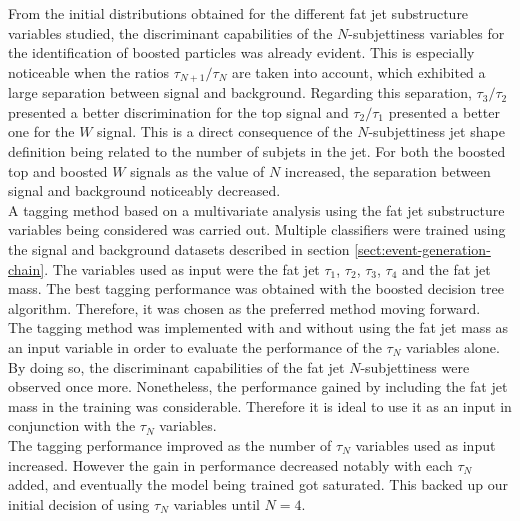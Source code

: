 \documentclass[main]{subfiles} %
\begin{document}


\doublespacing

\vspace{20pt}

From the initial distributions obtained for the different fat jet substructure variables studied, the discriminant capabilities of the $N$-subjettiness variables for the identification of boosted particles was already evident. This is especially noticeable when the ratios $\tau_{N+1}/\tau_N$ are taken into account, which exhibited a large separation between signal and background. Regarding this separation, $\tau_3/\tau_2$ presented a better discrimination for the top signal and $\tau_2/\tau_1$ presented a better one for the $W$ signal. This is a direct consequence of the $N$-subjettiness jet shape definition being related to the number of subjets in the jet. For both the boosted top and boosted $W$ signals as the value of $N$ increased, the separation between signal and background noticeably decreased. \\

A tagging method based on a multivariate analysis using the fat jet substructure variables being considered was carried out. Multiple classifiers were trained using the signal and background datasets described in section \ref{sect:event-generation-chain}. The variables used as input were the fat jet $\tau_1$, $\tau_2$, $\tau_3$, $\tau_4$ and the fat jet mass. The best tagging performance was obtained with the boosted decision tree algorithm. Therefore, it was chosen as the preferred method moving forward. \\

The tagging method was implemented with and without using the fat jet mass as an input variable in order to evaluate the performance of the $\tau_N$ variables alone. By doing so, the discriminant capabilities of the fat jet $N$-subjettiness were observed once more. Nonetheless, the performance gained by including the fat jet mass in the training was considerable. Therefore it is ideal to use it as an input in conjunction with the $\tau_N$ variables. \\

The tagging performance improved as the number of $\tau_N$ variables used as input increased. However the gain in performance decreased notably with each $\tau_N$ added, and eventually the model being trained got saturated. This backed up our initial decision of using $\tau_N$ variables until $N = 4$. \\
\end{document}
